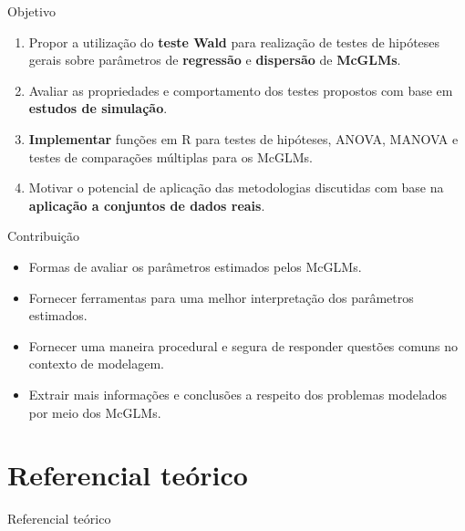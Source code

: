 \documentclass[
  ignorenonframetext,
  serif,
  professionalfont,
  usenames,
  dvipsnames,
  aspectratio = 169]{beamer}
\begin{document}
\begin{frame}{Objetivo}
\protect\hypertarget{objetivo}{}
\begin{enumerate}
  \itemsep 2ex
  
 \item Propor a utilização do \textbf{teste Wald} para realização de testes de hipóteses gerais sobre parâmetros de \textbf{regressão} e \textbf{dispersão} de \textbf{McGLMs}.

 \item Avaliar as propriedades e comportamento dos testes propostos com base em \textbf{estudos de simulação}.
 
 \item \textbf{Implementar} funções em R para testes de hipóteses, ANOVA, MANOVA e testes de comparações múltiplas para os McGLMs. 
 
 \item Motivar o potencial de aplicação das metodologias discutidas com base na \textbf{aplicação a conjuntos de dados reais}.

\end{enumerate}
\end{frame}

\begin{frame}{Contribuição}
\protect\hypertarget{contribuiuxe7uxe3o}{}
\begin{itemize}
  \itemsep 2ex
  
  \item Formas de avaliar os parâmetros estimados pelos McGLMs.

  \item Fornecer ferramentas para uma melhor interpretação dos parâmetros estimados.
 
  \item Fornecer uma maneira procedural e segura de responder questões comuns no contexto de modelagem.
 
  \item Extrair mais informações e conclusões a respeito dos problemas modelados por meio dos McGLMs.

\end{itemize}
\end{frame}

\hypertarget{referencial-teuxf3rico}{%
\section{Referencial teórico}\label{referencial-teuxf3rico}}

\begin{frame}{Referencial teórico}
\end{frame}
\end{document}
